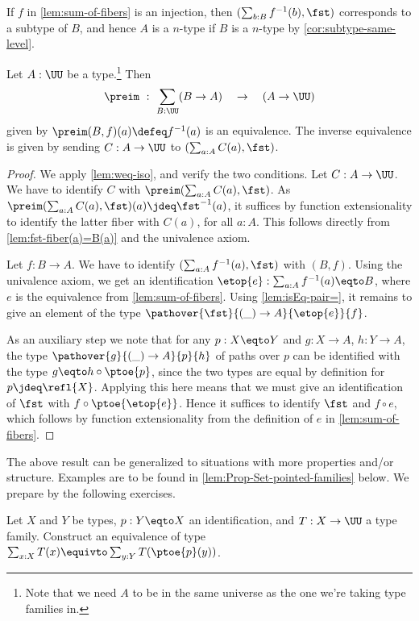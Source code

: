 If $f$ in \cref{lem:sum-of-fibers} is an injection, 
then $(\sum_{b:B} f^{-1}(b),\fst)$ corresponds to a subtype of $B$, and hence
$A$ is a $n$-type if $B$ is a $n$-type by \cref{cor:subtype-same-level}.

\begin{lemma}\label{lem:typefamiliesandfibrations}
  Let $A:\UU$ be a type.\footnote{%
    Note that we need $A$ to be in the same universe
    as the one we're taking type families in.}
  Then
  \[
    \preim ~:~ \sum_{B:\UU}(B\to A) \quad\to\quad (A\to\UU)
  \]
  given by $\preim(B,f)(a)\defeq f^{-1}(a)$ is an equivalence.
  The inverse equivalence is given by sending $C:A\to\UU$ to
  $(\sum_{a:A}C(a), \fst)$.
\end{lemma}

\begin{proof}
We apply \cref{lem:weq-iso}, and verify the two conditions.
Let $C:A\to\UU$. We have to identify $C$ with $\preim(\sum_{a:A}C(a), \fst)$.
As $\preim(\sum_{a:A}C(a), \fst)(a)\jdeq \fst^{-1}(a)$, it suffices
by function extensionality to identify the latter fiber with
$C(a)$, for all $a:A$. This follows directly from
\cref{lem:fst-fiber(a)=B(a)} and the univalence axiom.

Let $f: B\to A$.
We have to identify $(\sum_{a:A} f^{-1}(a), \fst)$ with $(B,f)$.
Using the univalence axiom, we get an identification
$\etop{e} : \sum_{a:A} f^{-1}(a) \eqto B$, where $e$ is the equivalence
from \cref{lem:sum-of-fibers}. Using \cref{lem:isEq-pair=},
it remains to give an element of the type
$\pathover{\fst}{(\_)\to A}{\etop{e}}{f}$.

As an auxiliary step we note that for any $p: X \eqto Y$ and $g:X\to A$,
$h:Y\to A$, the type $\pathover{g}{(\_)\to A}{p}{h}$ of paths over $p$
can be identified with the type $g \eqto h\circ{\ptoe{p}}$, since the two
types are equal by definition for $p\jdeq\refl{X}$.
Applying this here means that we must give an identification of
$\fst$ with $f\circ{\ptoe{\etop{e}}}$. Hence it suffices
to identify $\fst$ and $f\circ e$,
which follows by function extensionality from the definition
of $e$ in \cref{lem:sum-of-fibers}.
\end{proof}

The above result can be generalized to situations with more
properties and/or structure. Examples are to be found in
\cref{lem:Prop-Set-pointed-families} below.
We prepare by the following exercises.

\begin{xca}\label{xca:sum-base-path}
Let $X$ and $Y$ be types, $p: Y\eqto X$ an identification,
and $T: X\to\UU$ a type family.
Construct an equivalence of type
$\sum_{x:X} T(x) \equivto \sum_{y:Y} T(\ptoe{p}(y))$.
\end{xca}

